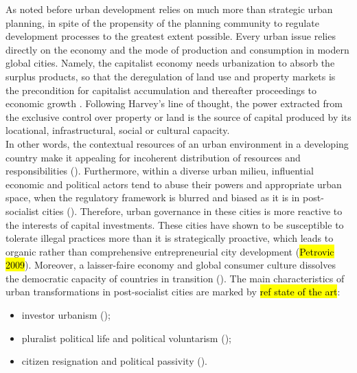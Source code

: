 \documentclass[11pt]{report}
\begin{document}
As noted before urban development relies on much more than strategic urban planning, in spite of the propensity of the planning community to regulate development processes to the greatest extent possible. Every urban issue relies directly on the economy and the mode of production and consumption in modern global cities.
Namely, the capitalist economy needs urbanization to absorb the surplus products, so that the deregulation of land use and property markets is the precondition for capitalist accumulation and thereafter proceedings to economic growth \cite{(Harvey 2012)}. Following Harvey’s line of thought, the power extracted from the exclusive control over property or land is the source of capital produced by its locational, infrastructural, social or cultural capacity.
\\
In other words, the contextual resources of an urban environment in a developing country make it appealing for incoherent distribution of resources and responsibilities (\cite{(Bolay et al. 2005)}). Furthermore, within a diverse urban milieu, influential economic and political actors tend to abuse their powers and appropriate urban space, when the regulatory framework is blurred and biased as it is in post-socialist cities (\cite{(Djokic et al. 2007)}). 
Therefore, urban governance in these cities is more reactive to the interests of capital investments.
These cities have shown to be susceptible to tolerate illegal practices more than it is strategically proactive, which leads to organic rather than comprehensive entrepreneurial city development (\hl{Petrovic 2009}).
Moreover, a laisser-faire economy and global consumer culture  dissolves the democratic capacity of countries in transition (\cite{(Ellin 1999)}). The main characteristics of urban transformations in post-socialist cities are marked by \hl{ref state of the art}:

\begin{itemize}
\item investor urbanism (\cite{(Vujosevic 2010)});
\item pluralist political life and political voluntarism (\cite{(Djokic et al. 2007)});
\item citizen resignation and political passivity (\cite{(Vujovic and Petrovic 2007)}).
\end{itemize}
\end{document}

